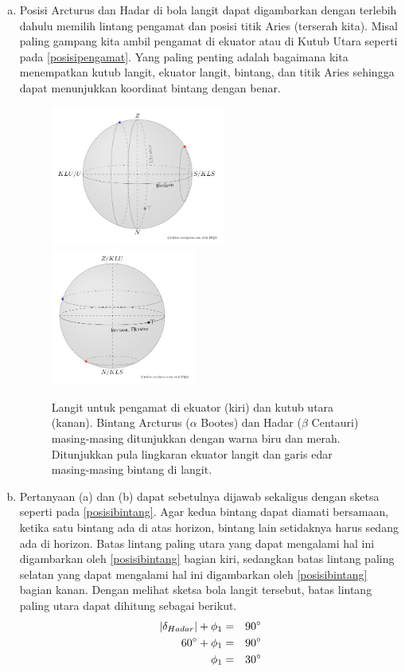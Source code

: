 \documentclass[11pt,fleqn]{exam}
\begin{document}
\begin{questions}
\begin{enumerate}[(a)]
\item Posisi Arcturus dan Hadar di bola langit dapat digambarkan dengan terlebih dahulu memilih lintang pengamat dan posisi titik Aries (terserah kita). Misal paling gampang kita ambil pengamat di ekuator atau di Kutub Utara seperti pada \autoref{posisipengamat}. Yang paling penting adalah bagaimana kita menempatkan kutub langit, ekuator langit, bintang, dan titik Aries sehingga dapat menunjukkan koordinat bintang dengan benar.

\begin{figure}[H]
\centering
\includegraphics[width=0.54\textwidth]{nomor20_eq.pdf}
\includegraphics[width=0.45\textwidth]{nomor20_NorthPole.pdf}
\caption{Langit untuk pengamat di ekuator (kiri) dan kutub utara (kanan). Bintang Arcturus ($\alpha$ Bootes) dan Hadar ($\beta$ Centauri) masing-masing ditunjukkan dengan warna biru dan merah. Ditunjukkan pula lingkaran ekuator langit dan garis edar masing-masing bintang di langit.}
\label{posisipengamat}
\end{figure}

\item Pertanyaan (a) dan (b) dapat sebetulnya dijawab sekaligus dengan sketsa seperti pada \autoref{posisibintang}. Agar kedua bintang dapat diamati bersamaan, ketika satu bintang ada di atas horizon, bintang lain setidaknya harus sedang ada di horizon. Batas lintang paling utara yang dapat mengalami hal ini digambarkan oleh \autoref{posisibintang} bagian kiri, sedangkan batas lintang paling selatan yang dapat mengalami hal ini digambarkan oleh \autoref{posisibintang} bagian kanan. Dengan melihat sketsa bola langit tersebut, batas lintang paling utara dapat dihitung sebagai berikut.
\begin{eqnarray*}
|\delta_{Hadar}|+\phi_{1}&=&90\textbf{\degree}\\
60\text{\degree}+\phi_{1}&=&90\text{\degree}\\
\phi_{1}&=&30\text{\degree}
\end{eqnarray*}


\end{enumerate}
\end{questions}
\end{document}
